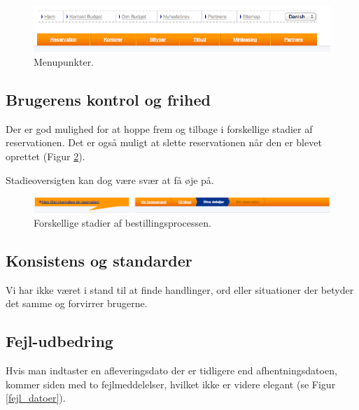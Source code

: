 \documentclass[a4paper]{article}
\begin{document}
\begin{figure}[htbp]
  \begin{center}
    \includegraphics[width=\textwidth]{2.png}
  \end{center}
  \caption{Menupunkter.}
  \label{menu}
\end{figure}

\subsection{Brugerens kontrol og frihed}
Der er god mulighed for at hoppe frem og tilbage i forskellige stadier af
reservationen. Det er også muligt at slette reservationen når den er blevet
oprettet (Figur \ref{stadier}).

Stadieoversigten kan dog være svær at få øje på.
\begin{figure}[htbp]
  \begin{center}
    \includegraphics[width=\textwidth]{9.png}
  \end{center}
  \caption{Forskellige stadier af bestillingsprocessen.}
  \label{stadier}
\end{figure}

\subsection{Konsistens og standarder}
Vi har ikke været i stand til at finde handlinger, ord eller situationer der
betyder det samme og forvirrer brugerne.

\subsection{Fejl-udbedring}
Hvis man indtaster en afleveringsdato der er tidligere end afhentningsdatoen,
kommer siden med to fejlmeddelelser, hvilket ikke er videre elegant (se Figur
\ref{fejl_datoer}).
\end{document}
